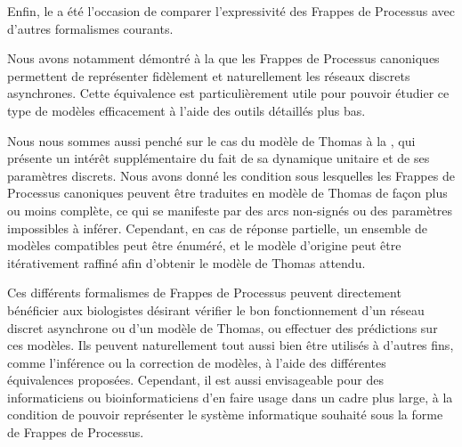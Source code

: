 \myskip

Enfin, le  a été l'occasion de comparer l'expressivité des
Frappes de Processus avec d'autres formalismes courants.

Nous avons notamment démontré à la  que les Frappes de Processus canoniques
permettent de représenter fidèlement et naturellement les réseaux discrets asynchrones.
Cette équivalence est particulièrement utile pour pouvoir étudier ce type de modèles
efficacement à l'aide des outils détaillés plus bas.

Nous nous sommes aussi penché sur le cas du modèle de Thomas à la ,
qui présente un intérêt supplémentaire du fait de sa dynamique unitaire
et de ses paramètres discrets.
Nous avons donné les condition sous lesquelles les Frappes de Processus canoniques
peuvent être traduites en modèle de Thomas de façon plus ou moins complète,
ce qui se manifeste par des arcs non-signés ou des paramètres impossibles à inférer.
Cependant, en cas de réponse partielle,
un ensemble de modèles compatibles peut être énuméré,
et le modèle d'origine peut être itérativement raffiné afin d'obtenir
le modèle de Thomas attendu.


\myskip

Ces différents formalismes de Frappes de Processus
peuvent directement bénéficier aux biologistes désirant
vérifier le bon fonctionnement d'un réseau discret asynchrone ou d'un modèle de Thomas,
ou effectuer des prédictions sur ces modèles.
Ils peuvent naturellement tout aussi bien être utilisés à d'autres fins,
comme l'inférence ou la correction de modèles, à l'aide des différentes équivalences proposées.
Cependant, il est aussi envisageable pour des informaticiens ou bioinformaticiens
d'en faire usage dans un cadre
plus large, à la condition de pouvoir représenter le système informatique souhaité
sous la forme de Frappes de Processus.



